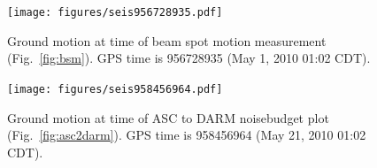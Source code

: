 \begin{figure}
\begin{centering}
\texttt{[image: figures/seis956728935.pdf]}
\caption[]{Ground motion at time of beam spot motion measurement
  (Fig.~\ref{fig:bsm}). GPS time is 956728935 (May 1, 2010 01:02
  CDT).}
\label{fig:seismic_bsm}
\end{centering}
\end{figure}


\begin{figure}
\begin{centering}
\texttt{[image: figures/seis958456964.pdf]}
\caption[]{Ground motion at time of ASC to DARM noisebudget plot
  (Fig.~\ref{fig:asc2darm}). GPS time is 958456964 (May 21, 2010 01:02
  CDT).}
\label{fig:seismic_NB}
\end{centering}
\end{figure}




